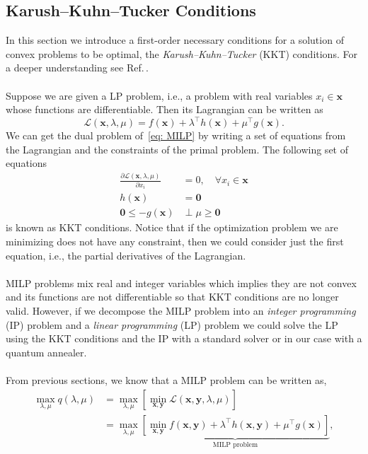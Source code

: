\subsection{Karush–Kuhn–Tucker Conditions}
In this section we introduce a first-order necessary conditions for a solution of convex problems to be optimal, the \textit{Karush–Kuhn–Tucker} (KKT) conditions. For a deeper understanding see Ref.\,\cite{Boyd2004}.\\\\
Suppose we are given a LP problem, i.e., a problem with real variables $x_{i}\in\mathbf{x}$ whose functions are differentiable. Then its Lagrangian can be written as
\begin{equation}
    \mathcal{L}(\mathbf{x}, \lambda, \mu) = f(\mathbf{x}) + \lambda^{\intercal}h(\mathbf{x}) + \mu^{\intercal}g(\mathbf{x}).
\end{equation}
We can get the dual problem of \,\eqref{eq: MILP} by writing a set of equations from the Lagrangian and the constraints of the primal problem. The following set of equations 
\begin{align}
    \frac{\partial \mathcal{L}(\mathbf{x},\lambda, \mu)}{\partial x_{i}} &= 0, \quad  \forall x_{i} \in \mathbf{x} \\
    h(\mathbf{x}) &= \mathbf{0} \\
    \mathbf{0}\leq - g(\mathbf{x})&\perp \mu \geq \mathbf{0} 
\end{align}
is known as KKT conditions. Notice that if the optimization problem we are minimizing does not have any constraint, then we could consider just the first equation, i.e., the partial derivatives of the Lagrangian.\\\\
MILP problems mix real and integer variables which implies they are not convex and its functions are not differentiable so that KKT conditions are no longer valid. However, if we decompose the MILP problem into an \textit{integer programming} (IP) problem and a \textit{linear programming} (LP) problem we could solve the LP using the KKT conditions and the IP with a standard solver or in our case with a quantum annealer.\\\\
From previous sections, we know that a MILP problem can be written as,
\begin{align}
    \max_{\lambda,\mu} q(\lambda,\mu) &=\max_{\lambda,\mu}\left[\min_{\mathbf{x},\mathbf{y}}\mathcal{L}(\mathbf{x}, \mathbf{y},\lambda,\mu)\right] \\
    &= \max_{\lambda,\mu}\underbrace{\left[\min_{\mathbf{x}, \mathbf{y}}f(\mathbf{x}, \mathbf{y}) + \lambda^{\intercal}h(\mathbf{x}, \mathbf{y}) + \mu^{\intercal}g(\mathbf{x})\right]}_{\text{MILP problem}} ,
\end{align}
